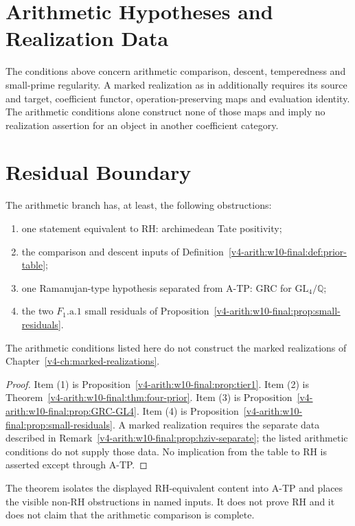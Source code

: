 \section{Arithmetic Hypotheses and Realization Data}
\label{v4-arith:w10-final:tier4}

\begin{remark}
\label{v4-arith:w10-final:prop:hziv-separate}
The conditions above concern arithmetic comparison, descent,
temperedness and small-prime regularity. A marked realization as in
 additionally requires its source and
target, coefficient functor, operation-preserving maps and evaluation
identity. The arithmetic conditions alone construct none of those
maps and imply no realization assertion for an object in another
coefficient category.
\end{remark}

\section{Residual Boundary}
\label{v4-arith:w10-final:residual-boundary}

\begin{theorem}
\label{v4-arith:w10-final:thm:near-closure}
\ClaimStatusProvedHere The arithmetic branch has, at least, the
following obstructions:
\begin{enumerate}
\item one statement equivalent to RH: archimedean Tate positivity;
\item the comparison and descent inputs of
Definition~\ref{v4-arith:w10-final:def:prior-table};
\item one Ramanujan-type hypothesis separated from A-TP: GRC for
\(\mathrm{GL}_{4}/\mathbb{Q}\);
\item the two \(F_{1}\text{.a.1}\) small residuals of
Proposition~\ref{v4-arith:w10-final:prop:small-residuals}.
\end{enumerate}
The arithmetic conditions listed here do not construct the marked
realizations of Chapter~\ref{v4-ch:marked-realizations}.
\end{theorem}

\begin{proof}
Item (1) is Proposition~\ref{v4-arith:w10-final:prop:tier1}. Item (2) is
Theorem~\ref{v4-arith:w10-final:thm:four-prior}. Item (3) is
Proposition~\ref{v4-arith:w10-final:prop:GRC-GL4}. Item (4) is
Proposition~\ref{v4-arith:w10-final:prop:small-residuals}. A marked realization
requires the separate data described in
Remark~\ref{v4-arith:w10-final:prop:hziv-separate}; the listed arithmetic
conditions do not supply those data.
No implication from the table to RH is asserted except through A-TP.
\end{proof}

\begin{remark}
\label{v4-arith:w10-final:rem:not-rh}
The theorem isolates the displayed RH-equivalent content into A-TP and
places the visible non-RH obstructions in named inputs.  It does not
prove RH and it does not claim that the arithmetic comparison is
complete.
\end{remark}
